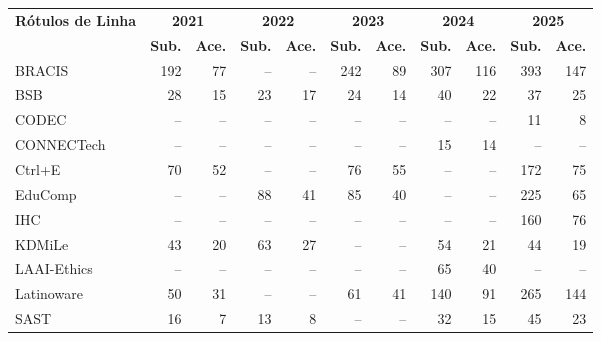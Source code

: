 \chapter{} \label{apen:appendix_B}

\appendix
\vspace*{-1.5cm} %

\begin{table}[H]

\centering
\label{tab:submetidos-aceitos}
\tiny
\setlength{\tabcolsep}{2pt}
\renewcommand{\arraystretch}{1}
\begin{tabular}{|l|rr|rr|rr|rr|rr|}
\hline
\multirow{2}{*}{\textbf{Rótulos de Linha}} & \multicolumn{2}{c|}{\textbf{2021}} & \multicolumn{2}{c|}{\textbf{2022}} & \multicolumn{2}{c|}{\textbf{2023}} & \multicolumn{2}{c|}{\textbf{2024}} & \multicolumn{2}{c|}{\textbf{2025}} \\
\cline{2-11}
 & \textbf{Sub.} & \textbf{Ace.} & \textbf{Sub.} & \textbf{Ace.} & \textbf{Sub.} & \textbf{Ace.} & \textbf{Sub.} & \textbf{Ace.} & \textbf{Sub.} & \textbf{Ace.} \\
\hline
BRACIS & 192 & 77 & -- & -- & 242 & 89 & 307 & 116 & 393 & 147 \\ \hline
BSB & 28 & 15 & 23 & 17 & 24 & 14 & 40 & 22 & 37 & 25 \\ \hline
CODEC & -- & -- & -- & -- & -- & -- & -- & -- & 11 & 8 \\ \hline
CONNECTech & -- & -- & -- & -- & -- & -- & 15 & 14 & -- & -- \\ \hline
Ctrl+E & 70 & 52 & -- & -- & 76 & 55 & -- & -- & 172 & 75 \\ \hline
EduComp & -- & -- & 88 & 41 & 85 & 40 & -- & -- & 225 & 65 \\ \hline
IHC & -- & -- & -- & -- & -- & -- & -- & -- & 160 & 76 \\ \hline
KDMiLe & 43 & 20 & 63 & 27 & -- & -- & 54 & 21 & 44 & 19 \\ \hline
LAAI-Ethics & -- & -- & -- & -- & -- & -- & 65 & 40 & -- & -- \\ \hline
Latinoware & 50 & 31 & -- & -- & 61 & 41 & 140 & 91 & 265 & 144 \\ \hline
SAST & 16 & 7 & 13 & 8 & -- & -- & 32 & 15 & 45 & 23 \\ \hline

\end{tabular}
\end{table}
